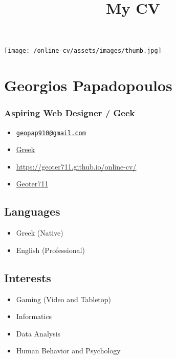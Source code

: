\documentclass[english,]{article}
\title{My CV}
\date{}
\providecommand{\tightlist}{%
  \setlength{\itemsep}{0pt}\setlength{\parskip}{0pt}}
\begin{document}
\maketitle

\texttt{[image: /online-cv/assets/images/thumb.jpg]}

\hypertarget{georgios-papadopoulos}{%
\section{Georgios Papadopoulos}\label{georgios-papadopoulos}}

\hypertarget{aspiring-web-designer-geek}{%
\subsubsection{Aspiring Web Designer /
Geek}\label{aspiring-web-designer-geek}}

\begin{itemize}
\tightlist
\item
  \emph{}
  \href{mailto:geopap910@gmail.com}{\nolinkurl{geopap910@gmail.com}}
\item
  \emph{} \href{}{Greek}
\item
  \emph{}
  \href{http://https://geoter711.github.io/online-cv/}{https://geoter711.github.io/online-cv/}
\item
  \emph{} \href{http://github.com/Geoter711}{Geoter711}
\end{itemize}

\hypertarget{languages}{%
\subsection{Languages}\label{languages}}

\begin{itemize}
\tightlist
\item
  Greek {(Native)}
\item
  English {(Professional)}
\end{itemize}

\hypertarget{interests}{%
\subsection{Interests}\label{interests}}

\begin{itemize}
\tightlist
\item
  Gaming (Video and Tabletop)
\item
  Informatics
\item
  Data Analysis
\item
  Human Behavior and Psychology
\end{itemize}
\end{document}
